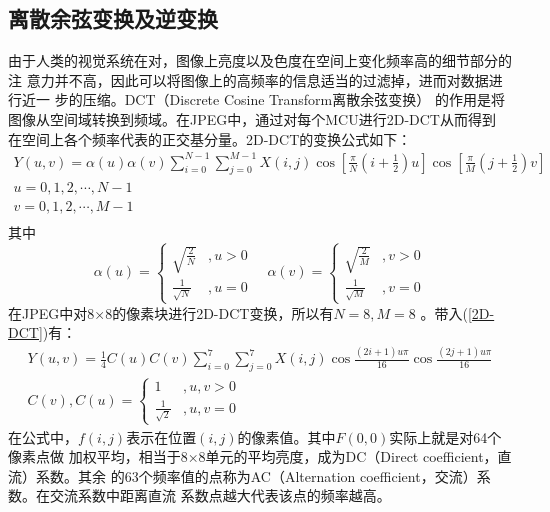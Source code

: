 \documentclass{article}
\numberwithin {equation}{section}
\begin{document}
\begin{spacing}{1.25}
  \subsection{离散余弦变换及逆变换}
    \vspace{1em}
    由于人类的视觉系统在对，图像上亮度以及色度在空间上变化频率高的细节部分的注
    意力并不高，因此可以将图像上的高频率的信息适当的过滤掉，进而对数据进行近一
    步的压缩。DCT\cite{ahmed2006discrete}（Discrete Cosine Transform离散余弦变换）
    的作用是将图像从空间域转换到频域。在JPEG中，通过对每个MCU进行2D-DCT从而得到
    在空间上各个频率代表的正交基分量。2D-DCT的变换公式如下：
    \begin{equation}
      \begin{gathered}
        Y(u,v)=\alpha (u)\alpha (v) \sum_{i=0}^{N-1} \sum_{j=0}^{M-1}
        X(i,j)\cos \left[ \frac{\pi}{N}\left(i+\frac{1}{2}\right)u \right]
        \cos \left[ \frac{\pi}{M}\left(j+\frac{1}{2}\right)v \right]\\
        u=0,1,2,\cdots ,N-1 \\
        v=0,1,2,\cdots,M-1 \\
      \end{gathered}
      \label{2D-DCT}
    \end{equation}
    其中
    \begin{equation}
      \alpha (u) = \begin{cases}
        \sqrt{\frac{2}{N}} &,u>0\\
        \frac{1}{\sqrt{N}} &,u=0
      \end{cases}\quad
      \alpha (v) = \begin{cases}
        \sqrt{\frac{2}{M}} &,v>0\\
        \frac{1}{\sqrt{M}} &,v=0
      \end{cases}
    \end{equation}
    在JPEG中对8×8的像素块进行2D-DCT变换，所以有$N=8,M=8$ 。带入(\ref{2D-DCT})有：
    \begin{equation}
      \begin{gathered}
        Y(u,v)=\frac{1}{4}C(u)C(v) \sum_{i=0}^{7} \sum_{j=0}^{7}
        X(i,j)\cos \frac{(2i+1)u\pi}{16}\cos \frac{(2j+1)u\pi}{16}\\
        C (v),C (u) = \begin{cases}
          1 &,u,v>0\\
          \frac{1}{\sqrt{2}} &,u,v=0
        \end{cases}
      \end{gathered}
      \label{8*8 2D-DCT}
    \end{equation}
    在公式中，$f(i,j)$表示在位置$(i,j)$的像素值。其中$F(0,0)$实际上就是对64个像素点做
    加权平均，相当于8×8单元的平均亮度，成为DC（Direct coefficient，直流）系数。其余
    的63个频率值的点称为AC（Alternation coefficient，交流）系数。在交流系数中距离直流
    系数点越大代表该点的频率越高。


\end{spacing}
\end{document}
